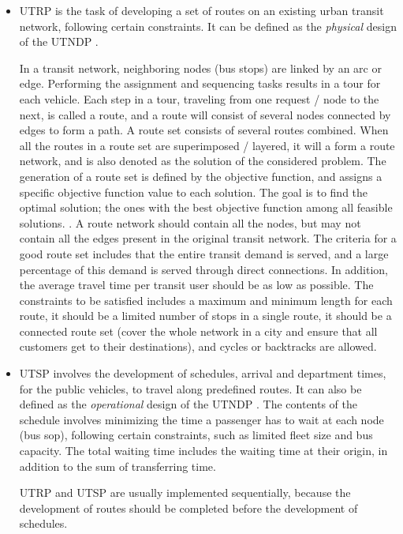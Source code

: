 \begin{itemize}
\item UTRP is the task of developing a set of routes on an existing urban transit network, following certain constraints. It can be defined as the \textit{physical} design of the UTNDP \citep{fan09}. 

In a transit network, neighboring nodes (bus stops) are linked by an arc or edge. Performing the assignment and sequencing tasks results in a tour for each vehicle. Each step in a tour, traveling from one request / node to the next, is called a route, and a route will consist of several nodes connected by edges to form a path. A route set consists of several routes combined. When all the routes in a route set are superimposed / layered, it will a form a route network, and is also denoted as the solution of the considered problem. The generation of a route set is defined by the objective function, and assigns a specific objective function value to each solution. The goal is to find the optimal solution; the ones with the best objective function among all feasible solutions. \citep{vehiclerouting}. A route network should contain all the nodes, but may not contain all the edges present in the original transit network. The criteria for a good route set includes that the entire transit demand is served, and a large percentage of this demand is served through direct connections. In addition, the average travel time per transit user should be as low as possible. The constraints to be satisfied includes a maximum and minimum length for each route, it should be a limited number of stops in a single route, it should be a connected route set  (cover the whole network in a city and ensure that all customers get to their destinations), and cycles or backtracks are allowed\citep{fan09}.

\item UTSP involves the development of schedules, arrival and department times, for the public vehicles, to travel along predefined routes. It can also be defined as the \textit{operational} design of the UTNDP \citep{fan09}. 
The contents of the schedule involves minimizing the time a passenger has to wait at each node (bus sop), following certain constraints, such as limited fleet size and bus capacity.  The total waiting time includes the waiting time at their origin, in addition to the sum of transferring time.

UTRP and UTSP are usually implemented sequentially, because the development of routes should be completed before the development of schedules. 
\end{itemize}

